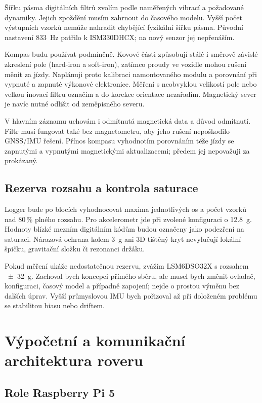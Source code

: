 Šířku pásma digitálních filtrů zvolím podle naměřených vibrací a požadované
dynamiky. Jejich zpoždění musím zahrnout do časového modelu. Vyšší počet
výstupních vzorků nemůže nahradit chybějící fyzikální šířku pásma.
Původní nastavení \SI{833}{Hz} patřilo k ISM330DHCX; na nový senzor jej
nepřenáším.

Kompas budu používat podmíněně. Kovové části způsobují stálé i směrově závislé
zkreslení pole (hard-iron a soft-iron), zatímco proudy ve vozidle mohou rušení
měnit za jízdy. Naplánuji proto kalibraci namontovaného modulu a porovnání při
vypnuté a zapnuté výkonové elektronice. Měření s neobvyklou velikostí pole
nebo velkou inovací filtru označím a do korekce orientace nezařadím.
Magnetický sever je navíc nutné odlišit od zeměpisného severu.

V hlavním záznamu uchovám i odmítnutá magnetická data a důvod odmítnutí.
Filtr musí fungovat také bez magnetometru, aby jeho rušení nepoškodilo
GNSS/IMU řešení. Přínos kompasu vyhodnotím porovnáním téže jízdy se zapnutými
a vypnutými magnetickými aktualizacemi; předem jej nepovažuji za prokázaný.

\subsection{Rezerva rozsahu a kontrola saturace}

Logger bude po blocích vyhodnocovat maxima jednotlivých os a počet vzorků
nad 80\,\% plného rozsahu. Pro akcelerometr jde při zvolené konfiguraci o
\SI{12.8}{g}. Hodnoty blízké mezním digitálním kódům budou označeny jako
podezření na saturaci. Nárazová ochrana kolem \SI{3}{g} ani 3D tištěný kryt
nevylučují lokální špičku, gravitační složku či rezonanci držáku.

Pokud měření ukáže nedostatečnou rezervu, zvážím LSM6DSO32X s rozsahem
\SI{\pm32}{g}. Zachoval bych koncepci přímého sběru, ale musel bych změnit
ovladač, konfiguraci, časový model a případně zapojení; nejde o prostou
výměnu bez dalších úprav. Vyšší průmyslovou IMU bych pořizoval až při
doloženém problému se stabilitou biasu nebo driftem.

\section{Výpočetní a komunikační architektura roveru}

\subsection{Role Raspberry Pi 5}

